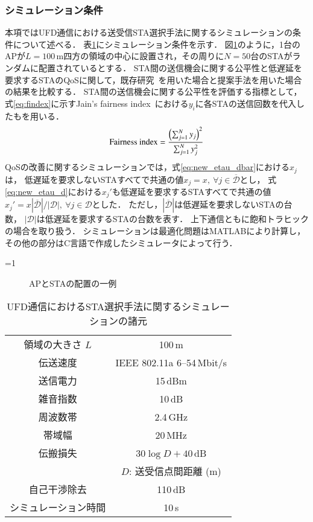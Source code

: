 \documentclass[technicalreport]{ieicej}
\newcounter{flagFig}
\begin{document}
		\subsubsection{シミュレーション条件}
			本項ではUFD通信における送受信STA選択手法に関するシミュレーションの条件について述べる．
			表\ref{tab:param}にシミュレーション条件を示す．
			図\ref{fig:pos}のように，1台のAPが$L=100$\,m四方の領域の中心に設置され，その周りに$N=50$台のSTAがランダムに配置されているとする．
			STA間の送信機会に関する公平性と低遅延を要求するSTAのQoSに関して，既存研究~\cite{promac}を用いた場合と提案手法を用いた場合の結果を比較する．
			STA間の送信機会に関する公平性を評価する指標として，
			式\eqref{eq:findex}に示すJain's fairness index~\cite{jain}における$y_i$に各STAの送信回数を代入したもを用いる．
			\begin{equation}
				{\rm Fairness\ index} = \frac{\left(\sum_{j=1}^N y_j\right)^2}{\sum_{j=1}^N y_j^2} \label{eq:findex}
			\end{equation}
			QoSの改善に関するシミュレーションでは，式\eqref{eq:new_etau_dbar}における$x_j$は，
			低遅延を要求しないSTAすべてで共通の値$x_j=x,\ \forall j\in {\overline {\mathcal D}}$とし，
			式\eqref{eq:new_etau_d}における$x_j'$も低遅延を要求するSTAすべてで共通の値$x_j'=x|{\overline {\mathcal D}}|/|{\mathcal D}|,\ \forall j \in {\mathcal D}$とした．
			ただし，$|{\overline {\mathcal D}}|$は低遅延を要求しないSTAの台数，
			$|{\mathcal D}|$は低遅延を要求するSTAの台数を表す．
			上下通信ともに飽和トラヒックの場合を取り扱う．
			シミュレーションは最適化問題はMATLABにより計算し，その他の部分はC言語で作成したシミュレータによって行う．

			\ifnum\value{flagFig}=1 {\begin{figure}[t]
				\centering
					\caption{APとSTAの配置の一例}
					\label{fig:pos}
			\end{figure}}\fi

			\begin{table}[t]
				\centering
					\caption{UFD通信におけるSTA選択手法に関するシミュレーションの諸元}
					\label{tab:param}
					\begin{tabular}{cc} \hline
						領域の大きさ $L$ & 100\,m \\
						伝送速度 & IEEE 802.11a 6--54\,Mbit/s \\
						送信電力 & 15\,dBm \\
						雑音指数 & 10\,dB \\
						周波数帯 & 2.4\,GHz \\
						帯域幅 & 20\,MHz \\
						伝搬損失 & $30\log D + 40$\,dB\\
						&$D$: 送受信点間距離 (m)\\
						自己干渉除去 & 110\,dB \\
						シミュレーション時間 & 10\,s \\\hline
					\end{tabular}
			\end{table}
\end{document}

